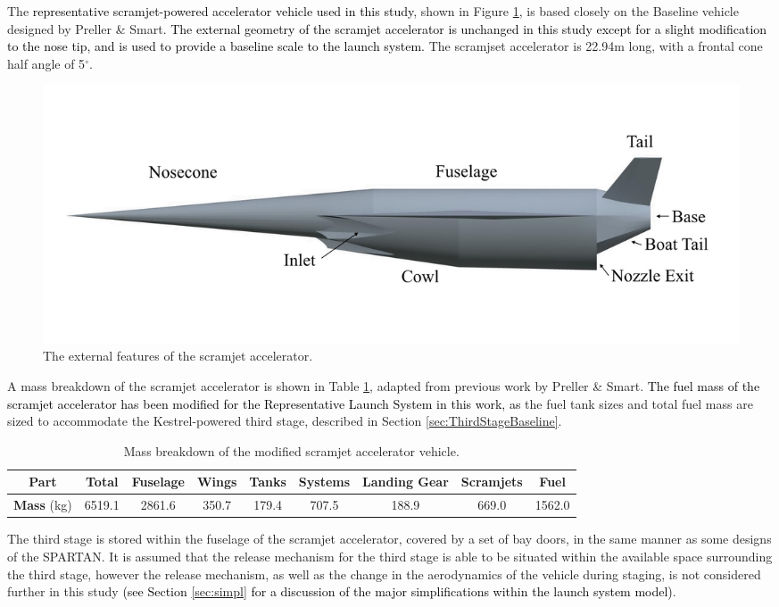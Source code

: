 		The \textcolor{black}{representative scramjet-powered accelerator vehicle used in this study}, shown in Figure \ref{fig:SPARTANlabelled}, is based closely on the Baseline vehicle designed by Preller \& Smart\cite{Preller2017b}. \textcolor{black}{The external geometry of the scramjet accelerator is unchanged in this study except for a slight modification to the nose tip, and is used to provide a baseline scale to the launch system.} The scramjset accelerator is 22.94m long, with a frontal cone half angle of 5$^\circ$\cite{Preller2017b}. 
		\begin{figure}[ht]
			\centering
			\includegraphics[width=0.85\linewidth]{figures/3_vehicle_design/SPARTANlabelled}
			\caption{The external features of the scramjet accelerator.}
			\label{fig:SPARTANlabelled}
		\end{figure}
		A mass breakdown of the scramjet accelerator is shown in Table \ref{tab:MassBreakdown}, adapted from previous work by Preller \& Smart\cite{Preller2017b}. \textcolor{black}{The fuel mass of the scramjet accelerator has been modified for the Representative Launch System in this work, as} the fuel tank sizes and total fuel mass are sized to accommodate the Kestrel-powered third stage, described in Section \ref{sec:ThirdStageBaseline}.
		\begin{table}[h]
		\begin{tabular}{|c|c|c|c|c|c|c|c|c|}
			\hline  \textbf{Part} & Total & Fuselage & Wings & Tanks & Systems & Landing Gear & Scramjets & Fuel \\ 
			\hline \textbf{Mass} (kg) & 6519.1 & 2861.6 & 350.7 & 179.4 & 707.5 & 188.9 & 669.0 & 1562.0 \\ 
			\hline 
		\end{tabular} 
		\caption{Mass breakdown of the modified scramjet accelerator vehicle.}
		\label{tab:MassBreakdown}
		\end{table}
The third stage is stored within the fuselage of the scramjet accelerator, covered by a set of bay doors, in the same manner as some designs of the SPARTAN\cite{Jazra2013}. It is assumed that the release mechanism for the third stage is able to be situated within the available space surrounding the third stage, however the release mechanism, as well as the change in the aerodynamics of the vehicle during staging,  is not considered further in this study \textcolor{black}{(see Section \ref{sec:simpl} for a discussion of the major simplifications within the launch system model)}. %
		

